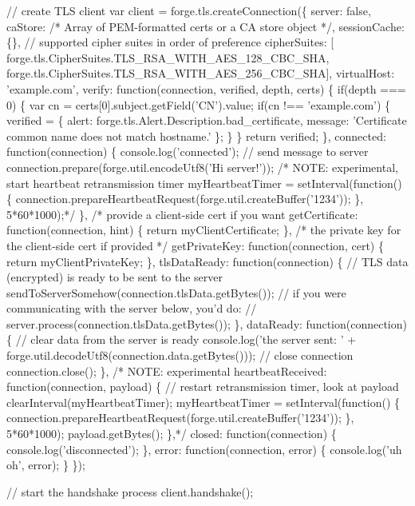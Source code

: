 \begin{DoxyCode}
// create TLS client
var client = forge.tls.createConnection(\{
  server: false,
  caStore: /* Array of PEM-formatted certs or a CA store object */,
  sessionCache: \{\},
  // supported cipher suites in order of preference
  cipherSuites: [
    forge.tls.CipherSuites.TLS\_RSA\_WITH\_AES\_128\_CBC\_SHA,
    forge.tls.CipherSuites.TLS\_RSA\_WITH\_AES\_256\_CBC\_SHA],
  virtualHost: 'example.com',
  verify: function(connection, verified, depth, certs) \{
    if(depth === 0) \{
      var cn = certs[0].subject.getField('CN').value;
      if(cn !== 'example.com') \{
        verified = \{
          alert: forge.tls.Alert.Description.bad\_certificate,
          message: 'Certificate common name does not match hostname.'
        \};
      \}
    \}
    return verified;
  \},
  connected: function(connection) \{
    console.log('connected');
    // send message to server
    connection.prepare(forge.util.encodeUtf8('Hi server!'));
    /* NOTE: experimental, start heartbeat retransmission timer
    myHeartbeatTimer = setInterval(function() \{
      connection.prepareHeartbeatRequest(forge.util.createBuffer('1234'));
    \}, 5*60*1000);*/
  \},
  /* provide a client-side cert if you want
  getCertificate: function(connection, hint) \{
    return myClientCertificate;
  \},
  /* the private key for the client-side cert if provided */
  getPrivateKey: function(connection, cert) \{
    return myClientPrivateKey;
  \},
  tlsDataReady: function(connection) \{
    // TLS data (encrypted) is ready to be sent to the server
    sendToServerSomehow(connection.tlsData.getBytes());
    // if you were communicating with the server below, you'd do:
    // server.process(connection.tlsData.getBytes());
  \},
  dataReady: function(connection) \{
    // clear data from the server is ready
    console.log('the server sent: ' +
      forge.util.decodeUtf8(connection.data.getBytes()));
    // close connection
    connection.close();
  \},
  /* NOTE: experimental
  heartbeatReceived: function(connection, payload) \{
    // restart retransmission timer, look at payload
    clearInterval(myHeartbeatTimer);
    myHeartbeatTimer = setInterval(function() \{
      connection.prepareHeartbeatRequest(forge.util.createBuffer('1234'));
    \}, 5*60*1000);
    payload.getBytes();
  \},*/
  closed: function(connection) \{
    console.log('disconnected');
  \},
  error: function(connection, error) \{
    console.log('uh oh', error);
  \}
\});

// start the handshake process
client.handshake();


\end{DoxyCode}
